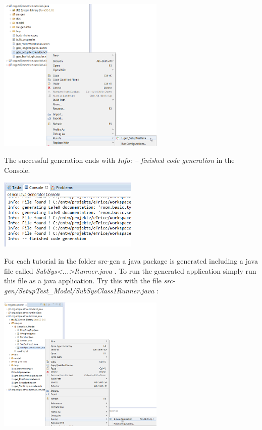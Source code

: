 \includegraphics[width=0.6\textwidth]{images/013-SetupWorkspace05.png}

\newpage
The successful generation ends with \emph{Info: -- finished code generation} in the Console.

\includegraphics[width=0.5\textwidth]{images/013-SetupWorkspace051.png}

For each tutorial in the folder src-gen a java package is generated including a java file called 
\emph{SubSys<...>Runner.java} . To run the generated application simply run this file as a java application.
Try this with the file \emph{src-gen/SetupTest\_Model/SubSysClass1Runner.java} :

\includegraphics[width=0.6\textwidth]{images/013-SetupWorkspace06.png}

